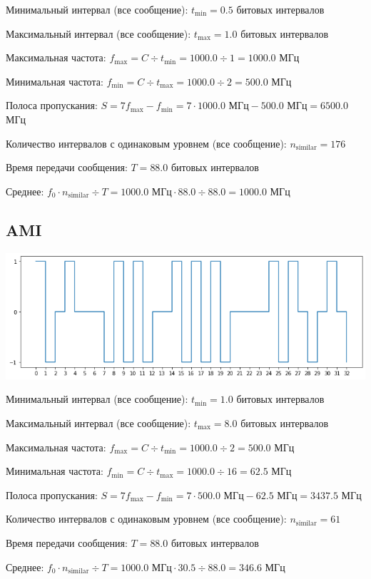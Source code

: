 Минимальный интервал (все сообщение): $t_\mathrm{min}=0.5$ битовых интервалов

Максимальный интервал (все сообщение): $t_\mathrm{max}=1.0$ битовых интервалов

Максимальная частота: $f_\mathrm{max}=C\div t_\mathrm{min}=1000.0\div 1=1000.0$ МГц

Минимальная частота: $f_\mathrm{min}=C\div t_\mathrm{max}=1000.0\div 2=500.0$ МГц

Полоса пропускания: $S=7f_\mathrm{max}-f_\mathrm{min} = 7\cdot 1000.0\text{ МГц}-500.0\text{ МГц}=6500.0$ МГц

Количество интервалов с одинаковым уровнем (все сообщение): $n_\mathrm{similar}=176$

Время передачи сообщения: $T=88.0$ битовых интервалов

Среднее: $f_0\cdot n_\mathrm{similar}\div T=1000.0\text{ МГц}\cdot 88.0\div 88.0=1000.0$ МГц

\subsection{AMI}
\includegraphics[width=\textwidth]{1ami}

Минимальный интервал (все сообщение): $t_\mathrm{min}=1.0$ битовых интервалов

Максимальный интервал (все сообщение): $t_\mathrm{max}=8.0$ битовых интервалов

Максимальная частота: $f_\mathrm{max}=C\div t_\mathrm{min}=1000.0\div 2=500.0$ МГц

Минимальная частота: $f_\mathrm{min}=C\div t_\mathrm{max}=1000.0\div 16=62.5$ МГц

Полоса пропускания: $S=7f_\mathrm{max}-f_\mathrm{min} = 7\cdot 500.0\text{ МГц}-62.5\text{ МГц}=3437.5$ МГц

Количество интервалов с одинаковым уровнем (все сообщение): $n_\mathrm{similar}=61$

Время передачи сообщения: $T=88.0$ битовых интервалов

Среднее: $f_0\cdot n_\mathrm{similar}\div T=1000.0\text{ МГц}\cdot 30.5\div 88.0=346.6$ МГц

